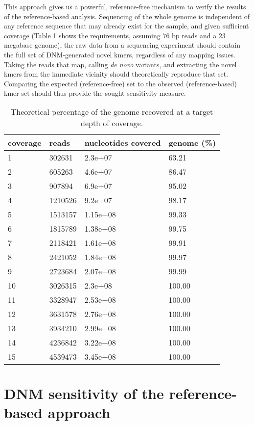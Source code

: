 This approach gives us a powerful, reference-free mechanism to verify the results of the reference-based analysis.  Sequencing of the whole genome is independent of any reference sequence that may already exist for the sample, and given sufficient coverage (Table \ref{tb:lw_cov} shows the requirements, assuming $76$ bp reads and a $23$ megabase genome), the raw data from a sequencing experiment should contain the full set of DNM-generated novel kmers, regardless of any mapping issues\cite{Lander:1988bp}.  Taking the reads that map, calling \textit{de novo} variants, and extracting the novel kmers from the immediate vicinity should theoretically reproduce that set.  Comparing the expected (reference-free) set to the observed (reference-based) kmer set should thus provide the sought sensitivity measure.

\begin{table}[]
\centering
\caption{Theoretical percentage of the genome recovered at a target depth of coverage.}
\label{tb:lw_cov}

\begin{tabular}{llll}
\toprule
coverage & reads & nucleotides covered & genome (\%)\\
\midrule
1 & 302631 & 2.3e+07 & 63.21\\
2 & 605263 & 4.6e+07 & 86.47\\
3 & 907894 & 6.9e+07 & 95.02\\
4 & 1210526 & 9.2e+07 & 98.17\\
5 & 1513157 & 1.15e+08 & 99.33\\
6 & 1815789 & 1.38e+08 & 99.75\\
7 & 2118421 & 1.61e+08 & 99.91\\
8 & 2421052 & 1.84e+08 & 99.97\\
9 & 2723684 & 2.07e+08 & 99.99\\
10 & 3026315 & 2.3e+08 & 100.00\\
11 & 3328947 & 2.53e+08 & 100.00\\
12 & 3631578 & 2.76e+08 & 100.00\\
13 & 3934210 & 2.99e+08 & 100.00\\
14 & 4236842 & 3.22e+08 & 100.00\\
15 & 4539473 & 3.45e+08 & 100.00\\
\bottomrule
\end{tabular}


\end{table}

\section{DNM sensitivity of the reference-based approach}

